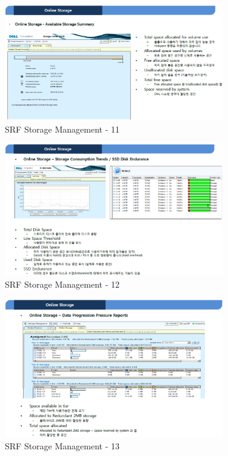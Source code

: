 \documentclass[11pt
  , a4paper
  , article
  , oneside
]{memoir}
\begin{document}
\begin{figure}[h!]
	\centering
	\includegraphics[width=0.85\textwidth]{./images/srfdb_storage_mana_11.eps}
	\caption{SRF Storage Management - 11}
	\label{fig:srfdb_mana_11} 
\end{figure}

\begin{figure}[h!]
	\centering
	\includegraphics[width=0.85\textwidth]{./images/srfdb_storage_mana_12.eps}
	\caption{SRF Storage Management - 12}
	\label{fig:srfdb_mana_12} 
\end{figure}

\begin{figure}[h!]
	\centering
	\includegraphics[width=0.85\textwidth]{./images/srfdb_storage_mana_13.eps}
	\caption{SRF Storage Management - 13}
	\label{fig:srfdb_mana_13} 
\end{figure}
\end{document}

